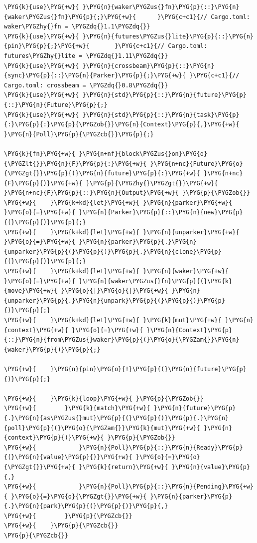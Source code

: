 \begin{Verbatim}[commandchars=\\\{\},breaklines=true,breakanywhere=true,fontsize=\codefont,xleftmargin=17bp]
\PYG{k}{use}\PYG{+w}{ }\PYG{n}{waker\PYGZus{}fn}\PYG{p}{::}\PYG{n}{waker\PYGZus{}fn}\PYG{p}{;}\PYG{+w}{      }\PYG{c+c1}{// Cargo.toml: waker\PYGZhy{}fn = \PYGZdq{}1.1\PYGZdq{}}
\PYG{k}{use}\PYG{+w}{ }\PYG{n}{futures\PYGZus{}lite}\PYG{p}{::}\PYG{n}{pin}\PYG{p}{;}\PYG{+w}{       }\PYG{c+c1}{// Cargo.toml: futures\PYGZhy{}lite = \PYGZdq{}1.11\PYGZdq{}}
\PYG{k}{use}\PYG{+w}{ }\PYG{n}{crossbeam}\PYG{p}{::}\PYG{n}{sync}\PYG{p}{::}\PYG{n}{Parker}\PYG{p}{;}\PYG{+w}{ }\PYG{c+c1}{// Cargo.toml: crossbeam = \PYGZdq{}0.8\PYGZdq{}}
\PYG{k}{use}\PYG{+w}{ }\PYG{n}{std}\PYG{p}{::}\PYG{n}{future}\PYG{p}{::}\PYG{n}{Future}\PYG{p}{;}
\PYG{k}{use}\PYG{+w}{ }\PYG{n}{std}\PYG{p}{::}\PYG{n}{task}\PYG{p}{:}\PYG{p}{:}\PYG{p}{\PYGZob{}}\PYG{n}{Context}\PYG{p}{,}\PYG{+w}{ }\PYG{n}{Poll}\PYG{p}{\PYGZcb{}}\PYG{p}{;}

\PYG{k}{fn}\PYG{+w}{ }\PYG{n+nf}{block\PYGZus{}on}\PYG{o}{\PYGZlt{}}\PYG{n}{F}\PYG{p}{:}\PYG{+w}{ }\PYG{n+nc}{Future}\PYG{o}{\PYGZgt{}}\PYG{p}{(}\PYG{n}{future}\PYG{p}{:}\PYG{+w}{ }\PYG{n+nc}{F}\PYG{p}{)}\PYG{+w}{ }\PYG{p}{\PYGZhy{}\PYGZgt{}}\PYG{+w}{ }\PYG{n+nc}{F}\PYG{p}{::}\PYG{n}{Output}\PYG{+w}{ }\PYG{p}{\PYGZob{}}
\PYG{+w}{    }\PYG{k+kd}{let}\PYG{+w}{ }\PYG{n}{parker}\PYG{+w}{ }\PYG{o}{=}\PYG{+w}{ }\PYG{n}{Parker}\PYG{p}{::}\PYG{n}{new}\PYG{p}{(}\PYG{p}{)}\PYG{p}{;}
\PYG{+w}{    }\PYG{k+kd}{let}\PYG{+w}{ }\PYG{n}{unparker}\PYG{+w}{ }\PYG{o}{=}\PYG{+w}{ }\PYG{n}{parker}\PYG{p}{.}\PYG{n}{unparker}\PYG{p}{(}\PYG{p}{)}\PYG{p}{.}\PYG{n}{clone}\PYG{p}{(}\PYG{p}{)}\PYG{p}{;}
\PYG{+w}{    }\PYG{k+kd}{let}\PYG{+w}{ }\PYG{n}{waker}\PYG{+w}{ }\PYG{o}{=}\PYG{+w}{ }\PYG{n}{waker\PYGZus{}fn}\PYG{p}{(}\PYG{k}{move}\PYG{+w}{ }\PYG{o}{|}\PYG{o}{|}\PYG{+w}{ }\PYG{n}{unparker}\PYG{p}{.}\PYG{n}{unpark}\PYG{p}{(}\PYG{p}{)}\PYG{p}{)}\PYG{p}{;}
\PYG{+w}{    }\PYG{k+kd}{let}\PYG{+w}{ }\PYG{k}{mut}\PYG{+w}{ }\PYG{n}{context}\PYG{+w}{ }\PYG{o}{=}\PYG{+w}{ }\PYG{n}{Context}\PYG{p}{::}\PYG{n}{from\PYGZus{}waker}\PYG{p}{(}\PYG{o}{\PYGZam{}}\PYG{n}{waker}\PYG{p}{)}\PYG{p}{;}

\PYG{+w}{    }\PYG{n}{pin}\PYG{o}{!}\PYG{p}{(}\PYG{n}{future}\PYG{p}{)}\PYG{p}{;}

\PYG{+w}{    }\PYG{k}{loop}\PYG{+w}{ }\PYG{p}{\PYGZob{}}
\PYG{+w}{        }\PYG{k}{match}\PYG{+w}{ }\PYG{n}{future}\PYG{p}{.}\PYG{n}{as\PYGZus{}mut}\PYG{p}{(}\PYG{p}{)}\PYG{p}{.}\PYG{n}{poll}\PYG{p}{(}\PYG{o}{\PYGZam{}}\PYG{k}{mut}\PYG{+w}{ }\PYG{n}{context}\PYG{p}{)}\PYG{+w}{ }\PYG{p}{\PYGZob{}}
\PYG{+w}{            }\PYG{n}{Poll}\PYG{p}{::}\PYG{n}{Ready}\PYG{p}{(}\PYG{n}{value}\PYG{p}{)}\PYG{+w}{ }\PYG{o}{=}\PYG{o}{\PYGZgt{}}\PYG{+w}{ }\PYG{k}{return}\PYG{+w}{ }\PYG{n}{value}\PYG{p}{,}
\PYG{+w}{            }\PYG{n}{Poll}\PYG{p}{::}\PYG{n}{Pending}\PYG{+w}{ }\PYG{o}{=}\PYG{o}{\PYGZgt{}}\PYG{+w}{ }\PYG{n}{parker}\PYG{p}{.}\PYG{n}{park}\PYG{p}{(}\PYG{p}{)}\PYG{p}{,}
\PYG{+w}{        }\PYG{p}{\PYGZcb{}}
\PYG{+w}{    }\PYG{p}{\PYGZcb{}}
\PYG{p}{\PYGZcb{}}
\end{Verbatim}

